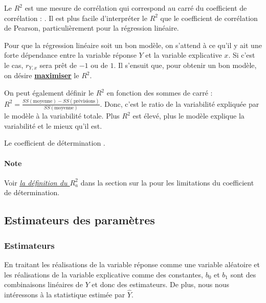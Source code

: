 \documentclass[french]{article}
\begin{document}
\begin{multicols*}{2}
\bigskip

\begin{definitionNOHFILL}
\begin{rappel_enhanced}[Contexte]
Le $R^{2}$ est une mesure de corrélation qui correspond au carré du coefficient de corrélation : . Il est plus facile d'interpréter le $R^{2}$ que le coefficient de corrélation de Pearson, particulièrement pour la régression linéaire.

\bigskip

Pour que la régression linéaire soit un bon modèle, on s'attend à ce qu'il y ait une forte dépendance entre la variable réponse $Y$ et la variable explicative $x$. Si c'est le cas, $r_{Y, x}$ sera prêt de $-1$ ou de $1$. Il s'ensuit que, pour obtenir un bon modèle, on désire \textbf{\underline{maximiser}} le $R^{2}$.

\bigskip

On peut également définir le $R^{2}$ en fonction des sommes de carré : $R^{2} = \frac{SS(\text{moyenne}) - SS(\text{prévisions})}{SS(\text{moyenne})}$. Donc, c'est le ratio de la variabilité expliquée par le modèle à la variabilité totale. Plus $R^{2}$ est élevé, plus le modèle explique la variabilité et le mieux qu'il est.
\end{rappel_enhanced}

Le coefficient de détermination .
\end{definitionNOHFILL}

\paragraph{Note}	Voir \textit{\color{bleudefrance}\underline{\hyperlink{adjustedR2}{\color{bleudefrance} la définition du $R^{2}_{a}$}}} dans la section sur la \textit{\underline{}} pour les limitations du coefficient de détermination.



\columnbreak	
\subsection{Estimateurs des paramètres}
\subsubsection{Estimateurs}
En traitant les réalisations de la variable réponse comme une variable aléatoire et les réalisations de la variable explicative comme des constantes, $b_{0}$ et $b_{1}$ sont des combinaisons linéaires de $Y$ et donc des estimateurs. De plus, nous nous intéressons à la statistique  estimée par $\hat{Y}$.


\end{multicols*}
\end{document}
